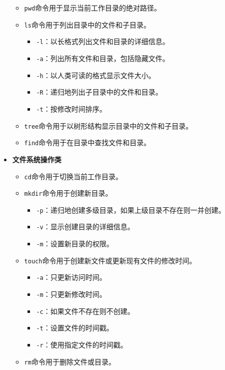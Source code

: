 \documentclass[../main.tex]{subfiles}
\begin{document}
\begin{itemize}
\begin{itemize}
      \item \texttt{pwd}命令用于显示当前工作目录的绝对路径。
      \item \texttt{ls}命令用于列出目录中的文件和子目录。
        \begin{itemize}
          \item \texttt{-l}：以长格式列出文件和目录的详细信息。
          \item \texttt{-a}：列出所有文件和目录，包括隐藏文件。
          \item \texttt{-h}：以人类可读的格式显示文件大小。
          \item \texttt{-R}：递归地列出子目录中的文件和目录。
          \item \texttt{-t}：按修改时间排序。
        \end{itemize}
      \item \texttt{tree}命令用于以树形结构显示目录中的文件和子目录。
      \item \texttt{find}命令用于在目录中查找文件和目录。
    \end{itemize}
  \item \textbf{文件系统操作类}
    \begin{itemize}
      \item \texttt{cd}命令用于切换当前工作目录。
      \item \texttt{mkdir}命令用于创建新目录。
        \begin{itemize}
          \item \texttt{-p}：递归地创建多级目录，如果上级目录不存在则一并创建。
          \item \texttt{-v}：显示创建目录的详细信息。
          \item \texttt{-m}：设置新目录的权限。
        \end{itemize}
      \item \texttt{touch}命令用于创建新文件或更新现有文件的修改时间。
        \begin{itemize}
          \item \texttt{-a}：只更新访问时间。
          \item \texttt{-m}：只更新修改时间。
          \item \texttt{-c}：如果文件不存在则不创建。
          \item \texttt{-t}：设置文件的时间戳。
          \item \texttt{-r}：使用指定文件的时间戳。
        \end{itemize}
      \item \texttt{rm}命令用于删除文件或目录。
        \begin{itemize}

\end{itemize}
\end{itemize}
\end{itemize}
\end{document}
